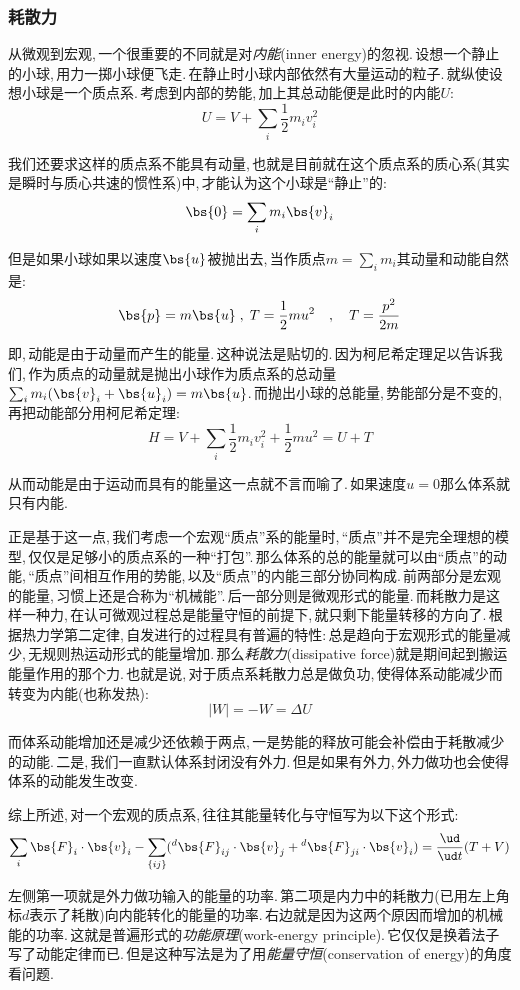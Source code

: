 \subsubsection{耗散力}
从微观到宏观,\,一个很重要的不同就是对\emph{内能}(inner energy)的忽视.\,设想一个静止的小球,\,用力一掷小球便飞走.\,在静止时小球内部依然有大量运动的粒子.\,就纵使设想小球是一个质点系.\,考虑到内部的势能,\,加上其总动能便是此时的内能$U$:
\[U=V+\sum_i \frac{1}{2}m_iv_i^2\]

我们还要求这样的质点系不能具有动量,\,也就是目前就在这个质点系的质心系(其实是瞬时与质心共速的惯性系)中,\,才能认为这个小球是``静止''的:
\[\bs{0}=\sum_i m_i\bs{v}_i\]

但是如果小球如果以速度$\bs{u}$被抛出去,\,当作质点$m=\displaystyle\sum_i m_i$其动量和动能自然是:
\[\bs{p}=m\bs{u}\;,\; T=\frac{1}{2}mu^2\quad ,\quad T=\frac{p^2}{2m}\]

即,\,动能是由于动量而产生的能量.\,这种说法是贴切的.\,因为柯尼希定理足以告诉我们,\,作为质点的动量就是抛出小球作为质点系的总动量$\sum_i m_i(\bs{v}_i+\bs{u}_i)=m\bs{u}$.\,而抛出小球的总能量,\,势能部分是不变的,\,再把动能部分用柯尼希定理:
\[H=V+\sum_i \frac{1}{2}m_iv_i^2+\frac{1}{2}mu^2=U+T\]

从而动能是由于运动而具有的能量这一点就不言而喻了.\,如果速度$u=0$那么体系就只有内能.

正是基于这一点,\,我们考虑一个宏观``质点''系的能量时,\,``质点''并不是完全理想的模型,\,仅仅是足够小的质点系的一种``打包''.\,那么体系的总的能量就可以由``质点''的动能,\,``质点''间相互作用的势能,\,以及``质点''的内能三部分协同构成.\,前两部分是宏观的能量,\,习惯上还是合称为``机械能''.\,后一部分则是微观形式的能量.\,而耗散力是这样一种力,\,在认可微观过程总是能量守恒的前提下,\,就只剩下能量转移的方向了.\,根据热力学第二定律,\,自发进行的过程具有普遍的特性:\,总是趋向于宏观形式的能量减少,\,无规则热运动形式的能量增加.\,那么\emph{耗散力}(dissipative force)就是期间起到搬运能量作用的那个力.\,也就是说,\,对于质点系耗散力总是做负功,\,使得体系动能减少而转变为内能(也称发热):
\[|W|=-W=\Delta U\]

而体系动能增加还是减少还依赖于两点,\,一是势能的释放可能会补偿由于耗散减少的动能.\,二是,\,我们一直默认体系封闭没有外力.\,但是如果有外力,\,外力做功也会使得体系的动能发生改变.

综上所述,\,对一个宏观的质点系,\,往往其能量转化与守恒写为以下这个形式:
\[\sum_i \bs{F}_i\cdot \bs{v}_i-\sum_{\{ij\}}(\phantom{}^d\bs{F}_{ij}\cdot \bs{v}_j+\phantom{}^d\bs{F}_{ji}\cdot \bs{v}_i)=\frac{\ud}{\ud t}(T+V)\]

左侧第一项就是外力做功输入的能量的功率.\,第二项是内力中的耗散力(已用左上角标$d$表示了耗散)向内能转化的能量的功率.\,右边就是因为这两个原因而增加的机械能的功率.\,这就是普遍形式的\emph{功能原理}(work-energy principle).\,它仅仅是换着法子写了动能定律而已.\,但是这种写法是为了用\emph{能量守恒}(conservation of energy)的角度看问题.


